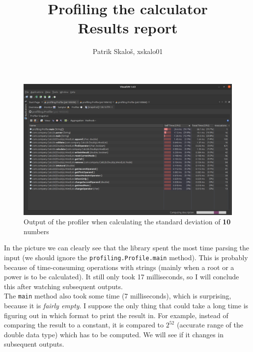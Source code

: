 \documentclass[12pt]{article}
\title{\vspace{4cm}\Huge{Profiling the calculator} \\ \vspace{1cm} \LARGE{Results report}\vfill}
\author{Patrik Skaloš, xskalo01 \vspace{5cm}}
\date{}
\begin{document}
  \begin{landscape}
    \maketitle
  \end{landscape}


    \begin{figure}
      \begin{center}
        \includegraphics[width=16cm]{profiling_result-10_numbers.eps}
        \caption{Output of the profiler when calculating the standard deviation of \textbf{10} numbers}
      \end{center}
    \end{figure}

    In the picture we can clearly see that the library spent the most time 
    parsing the input (we should ignore the \texttt{profiling.Profile.main} method). 
    This is probably because of time-consuming operations with strings (mainly 
    when a root or a power is to be calculated). It still only took 17 milliseconds, 
    so I will conclude this after watching subsequent outputs. \\

    The \texttt{main} method also took some time (7 milliseconds), which is surprising,
    because it is \textit{fairly empty}. I suppose the only thing that could take a long
    time is figuring out in which format to print the result in. For example,
    instead of comparing the result to a constant, it is compared to $2^{52}$ 
    (accurate range of the double data type) which has to be computed. We will
    see if it changes in subsequent outputs.

    \newpage
\end{document}
